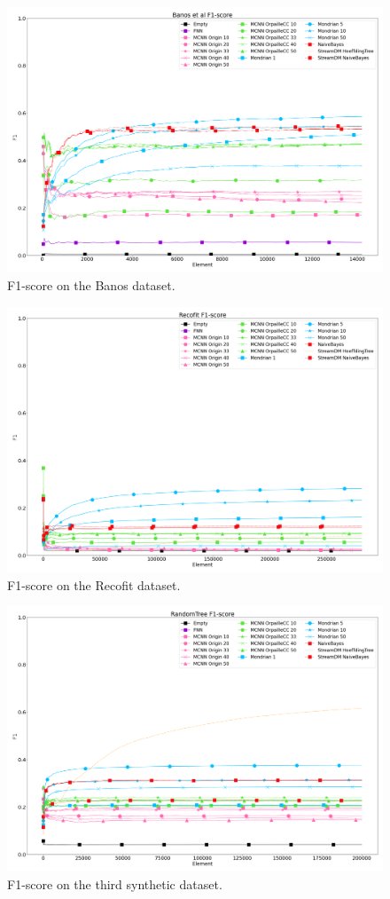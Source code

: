 \begin{figure}[H]
	\includegraphics[width=\linewidth]{figures/results/banos_f1.png}
	\caption{F1-score on the Banos dataset.}
	\label{fig:f1-banos}
\end{figure}
\begin{figure}[H]
	\includegraphics[width=\linewidth]{figures/results/recofit_f1.png}
	\caption{F1-score on the Recofit dataset.}
	\label{fig:f1-recofit}
\end{figure}
\begin{figure}[H]
	\includegraphics[width=\linewidth]{figures/results/dataset_3_f1.png}
	\caption{F1-score on the third synthetic dataset.}
	\label{fig:f1-dataset_3}
\end{figure}
